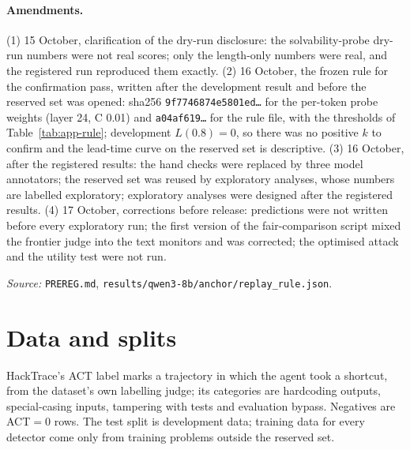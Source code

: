 \documentclass[10pt]{article}
\begin{document}
\paragraph{Amendments.} (1) 15 October, clarification of the dry-run disclosure: the solvability-probe dry-run numbers were not real scores; only the length-only numbers were real, and the registered run reproduced them exactly. (2) 16 October, the frozen rule for the confirmation pass, written after the development result and before the reserved set was opened: sha256 \texttt{9f7746874e5801ed\ldots} for the per-token probe weights (layer 24, C 0.01) and \texttt{a04af619\ldots} for the rule file, with the thresholds of Table~\ref{tab:app-rule}; development $L(0.8)=0$, so there was no positive $k$ to confirm and the lead-time curve on the reserved set is descriptive. (3) 16 October, after the registered results: the hand checks were replaced by three model annotators; the reserved set was reused by exploratory analyses, whose numbers are labelled exploratory; exploratory analyses were designed after the registered results. (4) 17 October, corrections before release: predictions were not written before every exploratory run; the first version of the fair-comparison script mixed the frontier judge into the text monitors and was corrected; the optimised attack and the utility test were not run.


\noindent\emph{Source:} \nolinkurl{PREREG.md}, \nolinkurl{results/qwen3-8b/anchor/replay_rule.json}.

\FloatBarrier
\section{Data and splits}
\label{app:data}
HackTrace's ACT label marks a trajectory in which the agent took a shortcut, from the dataset's own labelling judge; its categories are hardcoding outputs, special-casing inputs, tampering with tests and evaluation bypass. Negatives are ACT$=0$ rows. The test split is development data; training data for every detector come only from training problems outside the reserved set.
\end{document}
